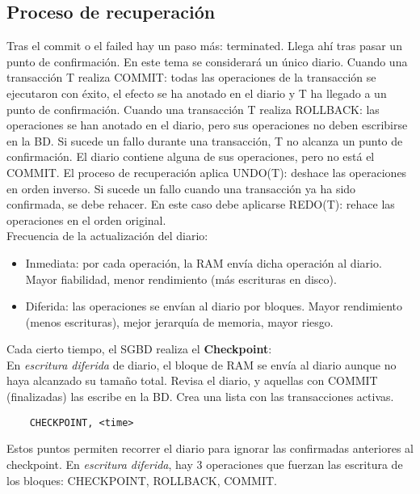 \documentclass{article}
\begin{document}
\subsection{Proceso de recuperación}
Tras el commit o el failed hay un paso más: terminated. Llega ahí tras pasar un punto de confirmación.
En este tema se considerará un único diario. 
Cuando una transacción T realiza COMMIT: todas las operaciones de la transacción se ejecutaron con éxito, el efecto se ha anotado en el diario y T ha llegado a un punto de confirmación.
Cuando una transacción T realiza ROLLBACK: las operaciones se han anotado en el diario, pero sus operaciones no deben escribirse en la BD. 
Si sucede un fallo durante una transacción, T no alcanza un punto de confirmación. El diario contiene alguna de sus operaciones, pero no está el COMMIT. El proceso de recuperación aplica UNDO(T): deshace las operaciones en orden inverso.
Si sucede un fallo cuando una transacción ya ha sido confirmada, se debe rehacer. En este caso debe aplicarse REDO(T): rehace las operaciones en el orden original.\\
Frecuencia de la actualización del diario:
\begin{itemize}
	\item Inmediata: por cada operación, la RAM envía dicha operación al diario. Mayor fiabilidad, menor rendimiento (más escrituras en disco).
	\item Diferida: las operaciones se envían al diario por bloques. Mayor rendimiento (menos escrituras), mejor jerarquía de memoria, mayor riesgo. 
\end{itemize}
Cada cierto tiempo, el SGBD realiza el \textbf{Checkpoint}: \\
En \textit{escritura diferida} de diario, el bloque de RAM se envía al diario aunque no haya alcanzado su tamaño total. Revisa el diario, y aquellas con COMMIT (finalizadas) las escribe en la BD. Crea una lista con las transacciones activas. 
\begin{verbatim}
	CHECKPOINT, <time>
\end{verbatim}
Estos puntos permiten recorrer el diario para ignorar las confirmadas anteriores al checkpoint. En \textit{escritura diferida}, hay 3 operaciones que fuerzan las escritura de los bloques: CHECKPOINT, ROLLBACK, COMMIT.
\end{document}
